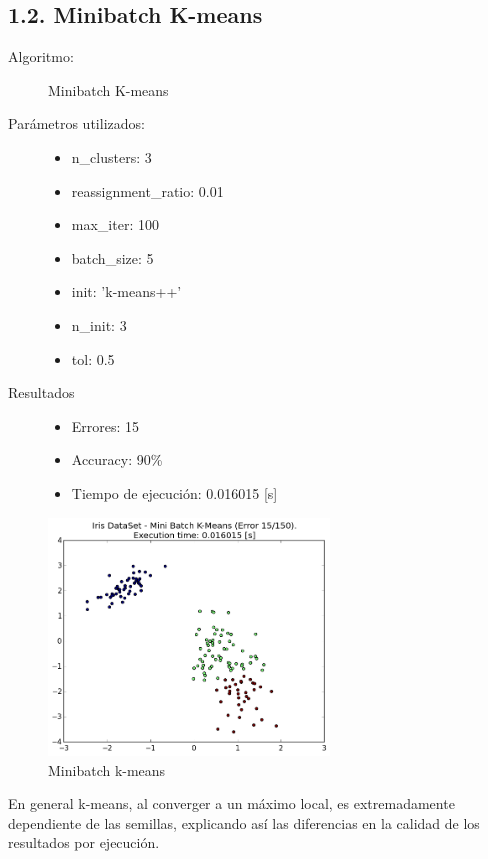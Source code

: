 \documentclass{article}
\begin{document}
\subsection*{1.2. \; Minibatch K-means}
\begin{description}
  \item[Algoritmo:] Minibatch K-means
  \item[Parámetros utilizados:] \hfill
    \begin{itemize}
      \item n\_clusters: 3
      \item reassignment\_ratio: 0.01
      \item max\_iter: 100
      \item batch\_size: 5
      \item init: 'k-means++'
      \item n\_init: 3
      \item tol: 0.5
    \end{itemize}
  \item[Resultados]\hfill
    \begin{itemize}
      \item Errores: 15
      \item Accuracy:  90\%
      \item Tiempo de ejecución: 0.016015 [s]
    \end{itemize}
\end{description}

\begin{figure}[H]
  \centering
  \includegraphics[width=0.666\textwidth]{img/MiniBatchK-Means.png}
  \caption{Minibatch k-means}
\end{figure}

En general k-means, al converger a un máximo local, es extremadamente dependiente de las semillas, explicando así las diferencias en la calidad de los resultados por ejecución.
\newpage
\end{document}
